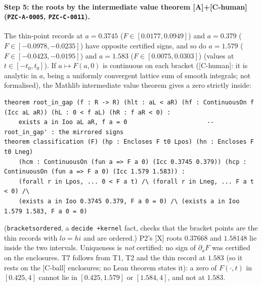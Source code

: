 \documentclass[10pt]{article}
\newcommand{\tier}[1]{\textsf{[#1]}}
\newcommand{\tA}{\tier{A}}
\newcommand{\tX}{\tier{X}}
\newcommand{\tCh}{\tier{C-human}}
\newcommand{\tCb}{\textcolor{blue!60!black}{\textsf{[C-ball]}}}
\newcommand{\lean}[1]{\texttt{#1}}
\renewcommand{\_}{\textunderscore\penalty0\hspace{0pt}}
\begin{document}
\paragraph{Step 5: the roots by the intermediate value theorem \tA{}+\tCh{} (\texttt{PZC-A-0005}, \texttt{PZC-C-0011}).}
The thin-point records at $a=0.3745$ ($F\in[0.0177,0.0949]$) and $a=0.379$ ($F\in[-0.0978,-0.0235]$) have opposite certified signs, and so do $a=1.579$ ($F\in[-0.0423,-0.0195]$) and $a=1.583$ ($F\in[0.0075,0.0303]$) (values at $t\in[-t_0,t_0]$). If $a\mapsto F(a,0)$ is continuous on each bracket (\tCh: it is analytic in $a$, being a uniformly convergent lattice sum of smooth integrals; not formalised), the Mathlib intermediate value theorem gives a zero strictly inside:
\begin{lstlisting}
theorem root_in_gap (f : R -> R) (hlt : aL < aR) (hf : ContinuousOn f (Icc aL aR)) (hL : 0 < f aL) (hR : f aR < 0) :
    exists a in Ioo aL aR, f a = 0                      -- root_in_gap' : the mirrored signs
theorem classification (F) (hp : Encloses F t0 Lpos) (hn : Encloses F t0 Lneg)
    (hcm : ContinuousOn (fun a => F a 0) (Icc 0.3745 0.379)) (hcp : ContinuousOn (fun a => F a 0) (Icc 1.579 1.583)) :
    (forall r in Lpos, ... 0 < F a t) /\ (forall r in Lneg, ... F a t < 0) /\
    (exists a in Ioo 0.3745 0.379, F a 0 = 0) /\ (exists a in Ioo 1.579 1.583, F a 0 = 0)
\end{lstlisting}
(\lean{brackets\_ordered}, a \lean{decide +kernel} fact, checks that the bracket points are the thin records with $lo=hi$ and are ordered.) P2's \tX{} roots $0.37668$ and $1.58148$ lie inside the two intervals. Uniqueness is \emph{not} certified: no sign of $\partial_aF$ was certified on the enclosures.
T7 follows from T1, T2 and the thin record at $1.583$ (so it rests on the \tCb{} enclosures; no Lean theorem states it): a zero of $F(\cdot,t)$ in $[0.425,4]$ cannot lie in $[0.425,1.579]$ or $[1.584,4]$, and not at $1.583$.
\end{document}
